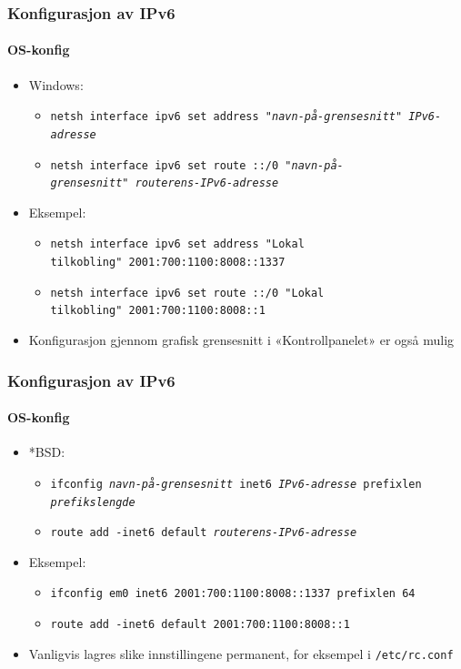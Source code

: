 \begin{frame}%
  \frametitle{Konfigurasjon av IPv6}
  \framesubtitle{OS-konfig}
  \begin{itemize}[<+->]
  \item Windows:
    \begin{itemize}[<+->]
    \item \texttt{netsh interface ipv6 set address\ "\textit{navn-på-grensesnitt}"\ \textit{IPv6-adresse}}
    \item \texttt{netsh interface ipv6 set route ::/0\ "\textit{navn-på-grensesnitt}"\ \textit{routerens-IPv6-adresse}}
    \end{itemize}
  \item Eksempel:
    \begin{itemize}[<+->]
    \item \texttt{netsh interface ipv6 set address\ "\texttt{Lokal tilkobling}"\ 2001:700:1100:8008::1337}
    \item \texttt{netsh interface ipv6 set route ::/0\ "\texttt{Lokal tilkobling}"\ 2001:700:1100:8008::1}
    \end{itemize}
  \item Konfigurasjon gjennom grafisk grensesnitt i «Kontrollpanelet» er også mulig
  \end{itemize}
\end{frame}

\begin{frame}%
  \frametitle{Konfigurasjon av IPv6}
  \framesubtitle{OS-konfig}
  \begin{itemize}[<+->]
  \item *BSD:
    \begin{itemize}[<+->]
    \item \texttt{ifconfig \textit{navn-på-grensesnitt} inet6 \textit{IPv6-adresse} prefixlen \textit{prefikslengde}}
    \item \texttt{route add -inet6 default \textit{routerens-IPv6-adresse}}
    \end{itemize}
  \item Eksempel:
    \begin{itemize}[<+->]
    \item \texttt{ifconfig em0 inet6 2001:700:1100:8008::1337 prefixlen 64}
    \item \texttt{route add -inet6 default 2001:700:1100:8008::1}
    \end{itemize}
  \item Vanligvis lagres slike innstillingene permanent, for eksempel i \texttt{/etc/rc.conf}
  \end{itemize}
\end{frame}

